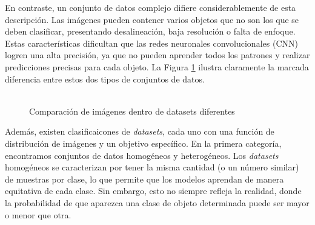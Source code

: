 En contraste, un conjunto de datos complejo difiere considerablemente de esta descripción. Las imágenes pueden contener varios objetos que no son los que se deben clasificar, presentando desalineación, baja resolución o falta de enfoque. Estas características dificultan que las redes neuronales convolucionales (CNN) logren una alta precisión, ya que no pueden aprender todos los patrones y realizar predicciones precisas para cada objeto. La Figura \ref{fig:combined} ilustra claramente la marcada diferencia entre estos dos tipos de conjuntos de datos.
\\\\
\begin{figure}%
    \centering
    \qquad
    \caption{Comparación de imágenes dentro de datasets diferentes}%
    \label{fig:combined}%
\end{figure}
Además, existen clasificaicones de \textit{datasets}, cada uno con una función de distribución de imágenes y un objetivo específico. En la primera categoría, encontramos conjuntos de datos homogéneos y heterogéneos. Los \textit{datasets} homogéneos se caracterizan por tener la misma cantidad (o un número similar) de muestras por clase, lo que permite que los modelos aprendan de manera equitativa de cada clase. Sin embargo, esto no siempre refleja la realidad, donde la probabilidad de que aparezca una clase de objeto determinada puede ser mayor o menor que otra.
\\\\
